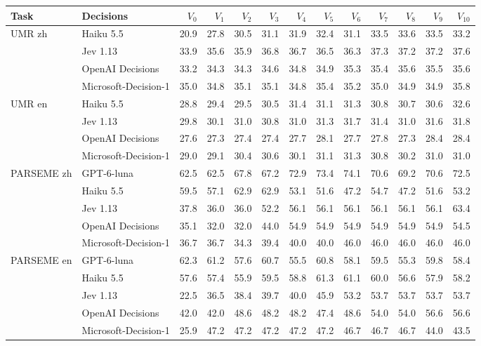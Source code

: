 \begin{tabular}{@{}llrrrrrrrrrrr@{}}
\toprule
Task & Decisions & $V_{0}$ & $V_{1}$ & $V_{2}$ & $V_{3}$ & $V_{4}$ & $V_{5}$ & $V_{6}$ & $V_{7}$ & $V_{8}$ & $V_{9}$ & $V_{10}$ \\
\midrule
UMR zh & Haiku 5.5 & 20.9 & 27.8 & 30.5 & 31.1 & 31.9 & 32.4 & 31.1 & 33.5 & 33.6 & 33.5 & 33.2 \\
 & Jev 1.13 & 33.9 & 35.6 & 35.9 & 36.8 & 36.7 & 36.5 & 36.3 & 37.3 & 37.2 & 37.2 & 37.6 \\
 & OpenAI Decisions & 33.2 & 34.3 & 34.3 & 34.6 & 34.8 & 34.9 & 35.3 & 35.4 & 35.6 & 35.5 & 35.6 \\
 & Microsoft-Decision-1 & 35.0 & 34.8 & 35.1 & 35.1 & 34.8 & 35.4 & 35.2 & 35.0 & 34.9 & 34.9 & 35.8 \\
\midrule
UMR en & Haiku 5.5 & 28.8 & 29.4 & 29.5 & 30.5 & 31.4 & 31.1 & 31.3 & 30.8 & 30.7 & 30.6 & 32.6 \\
 & Jev 1.13 & 29.8 & 30.1 & 31.0 & 30.8 & 31.0 & 31.3 & 31.7 & 31.4 & 31.0 & 31.6 & 31.8 \\
 & OpenAI Decisions & 27.6 & 27.3 & 27.4 & 27.4 & 27.7 & 28.1 & 27.7 & 27.8 & 27.3 & 28.4 & 28.4 \\
 & Microsoft-Decision-1 & 29.0 & 29.1 & 30.4 & 30.6 & 30.1 & 31.1 & 31.3 & 30.8 & 30.2 & 31.0 & 31.0 \\
\midrule
PARSEME zh & GPT-6-luna & 62.5 & 62.5 & 67.8 & 67.2 & 72.9 & 73.4 & 74.1 & 70.6 & 69.2 & 70.6 & 72.5 \\
 & Haiku 5.5 & 59.5 & 57.1 & 62.9 & 62.9 & 53.1 & 51.6 & 47.2 & 54.7 & 47.2 & 51.6 & 53.2 \\
 & Jev 1.13 & 37.8 & 36.0 & 36.0 & 52.2 & 56.1 & 56.1 & 56.1 & 56.1 & 56.1 & 56.1 & 63.4 \\
 & OpenAI Decisions & 35.1 & 32.0 & 32.0 & 44.0 & 54.9 & 54.9 & 54.9 & 54.9 & 54.9 & 54.9 & 54.5 \\
 & Microsoft-Decision-1 & 36.7 & 36.7 & 34.3 & 39.4 & 40.0 & 40.0 & 46.0 & 46.0 & 46.0 & 46.0 & 46.0 \\
\midrule
PARSEME en & GPT-6-luna & 62.3 & 61.2 & 57.6 & 60.7 & 55.5 & 60.8 & 58.1 & 59.5 & 55.3 & 59.8 & 58.4 \\
 & Haiku 5.5 & 57.6 & 57.4 & 55.9 & 59.5 & 58.8 & 61.3 & 61.1 & 60.0 & 56.6 & 57.9 & 58.2 \\
 & Jev 1.13 & 22.5 & 36.5 & 38.4 & 39.7 & 40.0 & 45.9 & 53.2 & 53.7 & 53.7 & 53.7 & 53.7 \\
 & OpenAI Decisions & 42.0 & 42.0 & 48.6 & 48.2 & 48.2 & 47.4 & 48.6 & 54.0 & 54.0 & 56.6 & 56.6 \\
 & Microsoft-Decision-1 & 25.9 & 47.2 & 47.2 & 47.2 & 47.2 & 47.2 & 46.7 & 46.7 & 46.7 & 44.0 & 43.5 \\
\bottomrule
\end{tabular}
